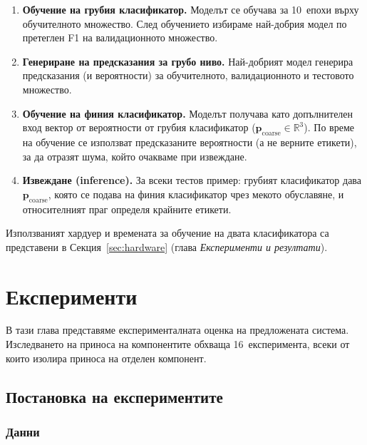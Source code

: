 \documentclass[12pt,a4paper]{report}
\begin{document}
\begin{enumerate}
  \item \textbf{Обучение на грубия класификатор.} Моделът се обучава за 10~епохи върху обучителното множество. След обучението избираме най-добрия модел по претеглен F1 на валидационното множество.

  \item \textbf{Генериране на предсказания за грубо ниво.} Най-добрият модел генерира предсказания (и вероятности) за обучителното, валидационното и тестовото множество.

  \item \textbf{Обучение на финия класификатор.} Моделът получава като допълнителен вход вектор от вероятности от грубия класификатор ($\mathbf{p}_{\text{coarse}} \in \mathbb{R}^3$). По време на обучение се използват предсказаните вероятности (а не верните етикети), за да отразят шума, който очакваме при извеждане.

  \item \textbf{Извеждане (inference).} За всеки тестов пример: грубият класификатор дава $\mathbf{p}_{\text{coarse}}$, която се подава на финия класификатор чрез мекото обуславяне, и относителният праг определя крайните етикети.
\end{enumerate}

Използваният хардуер и времената за обучение на двата класификатора са представени в Секция~\ref{sec:hardware} (глава \textit{Експерименти и резултати}).


\chapter{Експерименти}
\label{ch:experiments}

В тази глава представяме експерименталната оценка на предложената система. Изследването на приноса на компонентите обхваща 16~експеримента, всеки от които изолира приноса на отделен компонент.

\section{Постановка на експериментите}

\subsection{Данни}
\end{document}
